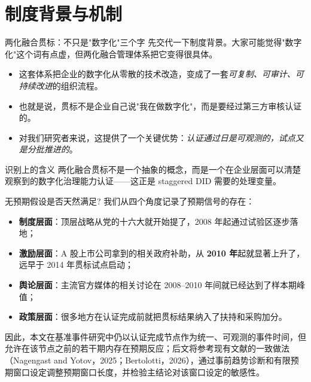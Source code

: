 \section{制度背景与机制}

\begin{frame}{两化融合贯标：不只是"数字化"三个字}
  先交代一下制度背景。大家可能觉得"数字化"这个词有点虚，但两化融合管理体系把它变得很具体。

  \begin{itemize}
    \item 这套体系把企业的数字化从零散的技术改造，变成了一套\emph{可复制、可审计、可持续改进}的组织流程。
    \item 也就是说，贯标不是企业自己说"我在做数字化"，而是要经过第三方审核认证的。
    \item 对我们研究者来说，这提供了一个关键优势：\emph{认证通过日是可观测的，试点又是分批推进的}。
  \end{itemize}

  \begin{methodbox}{识别上的含义}
    两化融合贯标不是一个抽象的概念，而是一个在企业层面可以清楚观察到的数字化治理能力认证——这正是 staggered DID 需要的处理变量。
  \end{methodbox}
\end{frame}

\begin{frame}{无预期假设是否天然满足?}
  我们从四个角度记录了预期信号的存在：
  \begin{itemize}
    \item \textbf{制度层面}：顶层战略从党的十六大就开始提了，2008 年起通过试验区逐步落地；
    \item \textbf{激励层面}：A 股上市公司拿到的相关政府补助，从 \textbf{2010 年}起就显著上升了，远早于 2014 年贯标试点启动；
    \item \textbf{舆论层面}：主流官方媒体的相关讨论在 2008--2010 年间就已经达到了样本期峰值；
    \item \textbf{政策层面}：很多地方在认证完成前就把贯标结果纳入了扶持和采购加分。
  \end{itemize}

  \vspace{0.3em}
  因此，本文在基准事件研究中仍以认证完成节点作为统一、可观测的事件时间，但允许在该节点之前的若干期内存在预期反应；后文将参考现有文献的一致做法（Nagengast and Yotov，2025；Bertolotti，2026），通过事前趋势诊断和有限预期窗口设定调整预期窗口长度，并检验主结论对该窗口设定的敏感性。
\end{frame}

